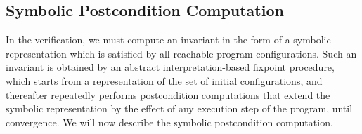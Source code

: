 \subsection{Symbolic Postcondition Computation}
\label{subsect:postcond}
In the  verification, we must compute an invariant in the form
of a symbolic representation
which is satisfied by all reachable program configurations.
Such an invariant is obtained by an abstract interpretation-based
fixpoint procedure, which starts
from a representation of the set of initial configurations, and
thereafter repeatedly performs postcondition computations that extend the
symbolic representation by the effect of any execution step of the program,
until convergence.
We will now describe the symbolic postcondition computation.

  


